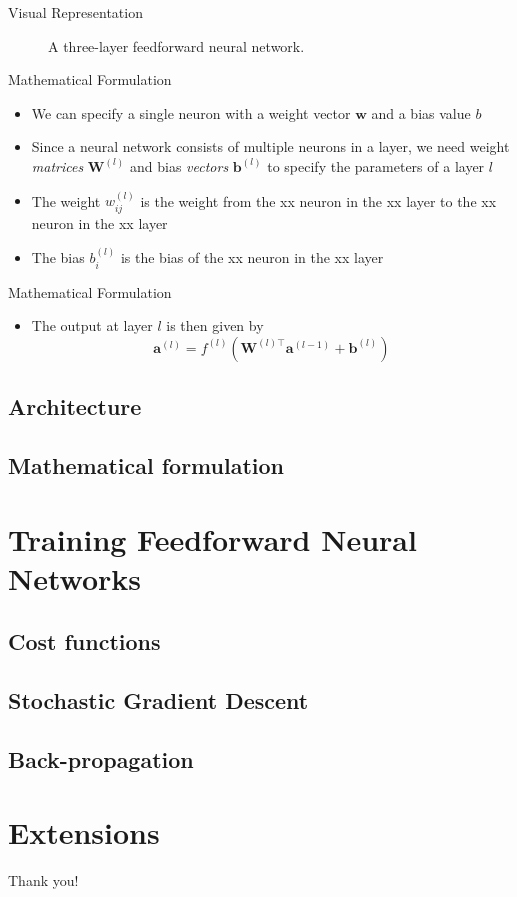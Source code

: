 \documentclass{beamer}
\begin{document}
	\begin{frame}{Visual Representation}
		\begin{figure}
			
			\caption{A three-layer feedforward neural network.}
		\end{figure}
	\end{frame}
	
	\begin{frame}{Mathematical Formulation}
		\begin{itemize}
			\item <1-> We can specify a single neuron with a weight vector $\bm{w}$ and a bias value $b$
			\item <2-> Since a neural network consists of multiple neurons in a layer, we need weight \emph{matrices} $\bm{W}^{(l)}$ and bias \emph{vectors} $\bm{b}^{(l)}$ to specify the parameters of a layer $l$
			\item <3-> The weight $w_{ij}^{(l)}$  is the weight from the xx neuron in the xx layer to the xx neuron in the xx layer
			\item <4-> The bias $b_i^{(l)}$ is the bias of the xx neuron in the xx layer
		\end{itemize}
	\end{frame}
	
	\begin{frame}{Mathematical Formulation}
		\begin{itemize}
			\item <1-> The output at layer $l$ is then given by
			\begin{equation}
				\bm{a}^{(l)} = f^{(l)}\left(\bm{W}^{(l)\top}\bm{a}^{(l-1)}+\bm{b}^{(l)}\right)
			\end{equation}
		\end{itemize}
	\end{frame}
	
	\subsection{Architecture}
	\subsection{Mathematical formulation}
	\section{Training Feedforward Neural Networks}
	\subsection{Cost functions}
	\subsection{Stochastic Gradient Descent}
	\subsection{Back-propagation}
	\section{Extensions}
	
	\begin{frame}[standout]
	Thank you!
	\end{frame}
	
\end{document}
